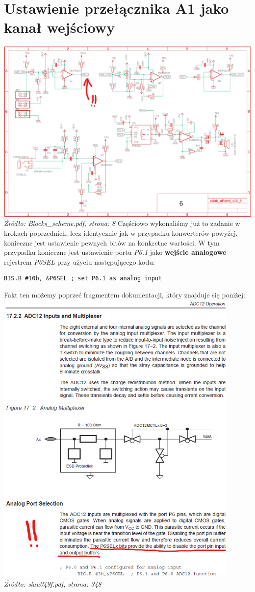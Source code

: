 \documentclass{article}
\begin{document}
\section{Ustawienie przełącznika A1 jako kanał wejściowy}
\includegraphics[width=\textwidth]{"../img/Blocks_scheme_8.png"}
\textit{Źródło: Blocks\_scheme.pdf, strona: 8}
Częściowo wykonaliśmy już to zadanie w krokach poprzednich, lecz identycznie jak w przypadku konwerterów powyżej, konieczne jest ustawienie pewnych bitów na konkretne wartości.
W tym przypadku konieczne jest ustawienie portu \textit{P6.1} jako \textbf{wejście analogowe} rejestrem \textit{P6SEL} przy użyciu następującego kodu:
\begin{verbatim}
BIS.B #10b, &P6SEL ; set P6.1 as analog input \end{verbatim}
Fakt ten możemy poprzeć fragmentem dokumentacji, który znajduje się poniżej: \\
\includegraphics[width=0.9\textwidth]{"../img/slau049f_348.png"} \\
\textit{Źródło: slau049f.pdf, strona: 348}
\end{document}
